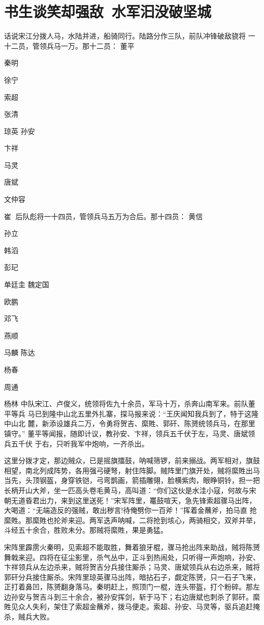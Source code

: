 \chapter{书生谈笑却强敌~水军汩没破坚城}

话说宋江分拨人马，水陆并进，船骑同行。陆路分作三队，前队冲锋破敌骁将
一十二员，管领兵马一万。那十二员：
董平

秦明

徐宁

索超

张清

琼英
孙安

卞祥

马灵

唐斌

文仲容

崔
后队彪将一十四员，管领兵马五万为合后。那十四员：
黄信

孙立

韩滔

彭玘

单廷圭
魏定国

欧鹏

邓飞

燕顺

马麟
陈达

杨春

周通

杨林
中队宋江、卢俊义，统领将佐九十余员，军马十万，杀奔山南军来。前队董平等兵
马已到隆中山北五里外扎寨，探马报来说：“王庆闻知我兵到了，特于这隆中山北
麓，新添设雄兵二万，令勇将贺吉、縻貹、郭矸、陈赟统领兵马，在那里镇守。”
董平等闻报，随即计议，教孙安、卞祥，领兵五千伏于左，马灵、唐斌领兵五千伏
于右，只听我军中炮响，一齐杀出。

这里分拨才定，那边贼众，已是摇旗擂鼓，呐喊筛锣，前来搦战。两军相对，旗鼓
相望，南北列成阵势，各用强弓硬弩，射住阵脚。贼阵里门旗开处，贼将縻貹出马
当先，头顶钢盔，身穿铁铠，弓弯鹊画，箭插雕翎，脸横紫肉，眼睁铜铃，担一把
长柄开山大斧，坐一匹高头卷毛黄马，高叫道：“你们这伙是水洼小寇，何故与宋
朝无道昏君出力，来到这里送死！”宋军阵里，鼍鼓喧天，急先锋索超骤马出阵，
大喝道：“无端造反的强贼，敢出秽言!待俺劈你一百斧！”挥着金蘸斧，拍马直
抢縻貹。那縻貹也抡斧来迎。两军迭声呐喊，二将抢到垓心，两骑相交，双斧并举，
斗经五十余合，胜败未分。那贼将縻貹，果是勇猛。

宋阵里霹雳火秦明，见索超不能取胜，舞着狼牙棍，骤马抢出阵来助战，贼将陈赟
舞戟来迎。四将在征尘影里，杀气丛中，正斗到热闹处，只听得一声炮响，孙安、
卞祥领兵从左边杀来，贼将贺吉分兵接住厮杀；马灵、唐斌领兵从右边杀来，贼将
郭矸分兵接住厮杀。宋阵里琼英骤马出阵，暗拈石子，觑定陈赟，只一石子飞来，
正打着鼻凹，陈赟翻身落马。秦明赶上，照顶门一棍，连头带盔，打个粉碎。那左
边孙安与贺吉斗到三十余合，被孙安挥剑，斩于马下；右边唐斌也刺杀了郭矸。縻
貹见众人失利，架住了索超金蘸斧，拨马便走。索超、孙安、马灵等，驱兵追赶掩
杀，贼兵大败。

